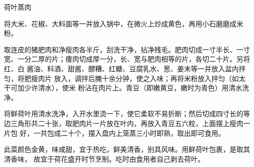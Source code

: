 %
%
%
%
%
%
%
\begin{recipe}{荷叶蒸肉}

\ingredients


\preparation

\step 将大米、花椒、大料面等一并放入锅中，在微火上炒成黄色，再用小石磨磨成米
粉。

\step 取连皮的猪肥肉和净瘦肉各半斤，刮洗干净，拈净残毛。肥肉切成一寸半长、一寸
宽、一分二厚的片；痩肉切成厚一分，长、宽与肥肉相等的片，各切二十片。另将红、白
酱油、料酒、甜酱、醪糟、红糖、豆腐乳水、葱、姜末等一并放入盆内拌匀，将肥瘦肉片
放入，调拌后腌十余分钟，使之入味；再将米粉放入拌匀（如太干可加少许清水），使米
粉沾在肉片上。青豆（即嫩黄豆，嫩时为青色）用清水洗净。

\step 将鲜荷叶用清水洗净，入开水里烫一下，使它柔软不易折断；然后切成四寸长的等
边三角形共二十张，取肥肉片一片放在叶内，再放入青豆五六粒，上面摆上瘦肉一片包
好，一共包成二十个，摆入盘内上笼蒸三小时即熟，取出即可食用。

\features

此菜颜色金黄，味咸甜，宜于热吃，鲜美清香，别具风味。用鲜荷叶包裹，是取其清香味，
故宜于荷花盛开时节烹制。吃时由食用者自己剥去荷叶。

\end{recipe}

